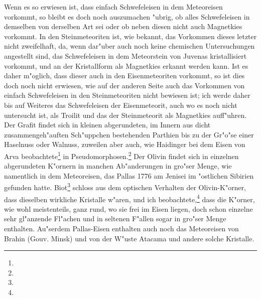 \documentclass[a4paper, 11pt, oneside]{article}
\begin{document}
Wenn es so erwiesen ist, dass einfach Schwefeleisen in dem Meteoreisen vorkommt, so bleibt es doch noch auszumachen "ubrig, ob alles Schwefeleisen in demselben von derselben Art sei oder ob neben diesen nicht auch Magnetkies vorkommt. In den Steinmeteoriten ist, wie bekannt, das Vorkommen dieses letzter nicht zweifelhaft, da, wenn dar"uber auch noch keine chemischen Untersuchungen angestellt sind, das Schwefeleisen in dem Meteorstein von Juvenas kristallisiert vorkommt, und an der Kristallform als Magnetkies erkannt werden kann. Ist es daher m"oglich, dass dieser auch in den Eisenmeteoriten vorkommt, so ist dies doch noch nicht erwiesen, wie auf der anderen Seite auch das Vorkommen von einfach Schwefeleisen in den Steinmeteoriten nicht bewiesen ist; ich werde daher bis auf Weiteres das Schwefeleisen der Eisenmeteorit, auch wo es noch nicht untersucht ist, als Troilit und das der Steinmeteorit als Magnetkies auff"uhren. Der Grafit findet sich in kleinen abgerundeten, im Innern aus dicht zusammengeh"auften Sch"uppchen bestehenden Parthien bis zu der Gr"o"se einer Haselnuss oder Walnuss, zuweilen aber auch, wie Haidinger bei dem Eisen von Arva beobachtete\footnote{} in Pseudomorphosen.\footnote{} Der Olivin findet sich in einzelnen abgerundeten K"ornern in manchen Ab"anderungen in gro"ser Menge, wie namentlich in dem Meteoreisen, das Pallas 1776 am Jenisei im "ostlichen Sibirien gefunden hatte. Biot\footnote{} schloss aus dem optischen Verhalten der Olivin-K"orner, dass dieselben wirkliche Kristalle w"aren, und ich beobachtete,\footnote{} dass die K"orner, wie wohl meistenteils, ganz rund, wo sie frei im Eisen liegen, doch schon einzelne sehr gl"anzende Fl"achen und in seltenen F"allen sogar in gro"ser Menge enthalten. Au"serdem Pallas-Eisen enthalten auch noch das Meteoreisen von Brahin (Gouv. Minsk) und von der W"uste Atacama und andere solche Kristalle.
\end{document}
